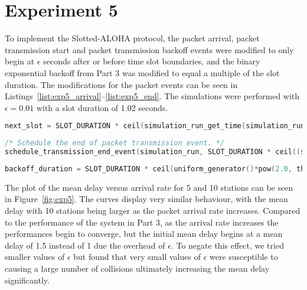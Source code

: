 \section*{Experiment 5}
To implement the Slotted-ALOHA protocol, the packet arrival, packet transmission start and packet transmission backoff events were modified to only begin at $\epsilon$ seconds after or before time slot boundaries, and the binary exponential backoff from Part 3 was modified to equal a multiple of the slot duration. The modifications for the packet events can be seen in Listings~\ref{list:exp5_arrival}--\ref{list:exp5_end}. The simulations were performed with $\epsilon = 0.01$ with a slot duration of 1.02 seconds. 

\begin{lstlisting}[language=c,caption=Packet Arrival, label=list:exp5_arrival]
next_slot = SLOT_DURATION * ceil(simulation_run_get_time(simulation_run) / SLOT_DURATION) + EPSILON;sion_start_event(simulation_run, now + backoff_duration, (void *) this_packet);
\end{lstlisting}

\begin{lstlisting}[language=c,caption=Packet Transmission Start, label=list:exp5_start]
/* Schedule the end of packet transmission event. */
schedule_transmission_end_event(simulation_run, SLOT_DURATION * ceil((simulation_run_get_time(simulation_run) + this_packet->service_time) / SLOT_DURATION) - EPSILON, (void *) this_packet);
\end{lstlisting}

\begin{lstlisting}[language=c,caption=Packet Transmission Backoff, label=list:exp5_end]
backoff_duration = SLOT_DURATION * ceil(uniform_generator()*pow(2.0, this_packet->collision_count));
\end{lstlisting}

The plot of the mean delay versus arrival rate for 5 and 10 stations can be seen in Figure~\ref{fig:exp5}. The curves display very similar behaviour, with the mean delay with 10 stations being larger as the packet arrival rate increases. Compared to the performance of the system in Part 3, as the arrival rate increases the performances begin to converge, but the initial mean delay begins at a mean delay of 1.5 instead of 1 due the overhead of $\epsilon$. To negate this effect, we tried smaller values of $\epsilon$ but found that very small values of $\epsilon$ were susceptible to causing a large number of collisions ultimately increasing the mean delay significantly.

